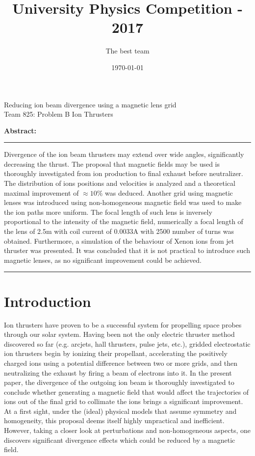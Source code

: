 \documentclass[twocolumn,12pt]{article}
\title{University Physics Competition - 2017}
\author{The best team}
\date{\today}
\numberwithin{equation}{section} %
\numberwithin{equation}{section}
\renewenvironment{abstract}{
\begin{center}
\begin{minipage}{0.85\textwidth}
\rule{\textwidth}{0pt}}
{\par\noindent\rule{\textwidth}{0pt}
\end{minipage} \end{center}}
\begin{document}
\begin{titlepage}
\begin{center}
\vspace{5mm}
\huge{Reducing ion beam divergence using a magnetic lens grid} \\
\vspace{5mm}
\Large{Team 825: Problem B Ion Thrusters} \\
\vspace{5mm}


\textbf{Abstract:}\\
\vspace{5mm}
\end{center}

\begin{abstract}
\justify
Divergence of the ion beam thrusters may extend over wide angles, significantly decreasing the thrust. The proposal that magnetic fields may be used is thoroughly investigated from ion production to final exhaust before neutralizer. The distribution of ions positions and velocities is analyzed and a theoretical maximal improvement of $\approx 10$\% was deduced. Another grid using magnetic lenses was introduced using non-homogeneous magnetic field was used to make the ion paths more uniform. The focal length of such lens is inversely proportional to the intensity of the magnetic field, numerically a focal length of the lens of 2.5m with coil current of 0.0033A with 2500 number of turns was obtained. Furthermore, a simulation of the behaviour of Xenon ions from jet thruster was presented. It was concluded that it is not practical to introduce such magnetic lenses, as no significant improvement could be achieved.

\end{abstract}
\end{titlepage}
\newpage



\tableofcontents

\justify

\section{Introduction}

Ion thrusters have proven to be a successful system for propelling space probes through our solar system. Having been not the only electric thruster method discovered so far (e.g. arcjets, hall thrusters, pulse jets, etc.), gridded electrostatic ion thrusters begin by ionizing their propellant, accelerating the positively charged ions using a potential difference between two or more grids, and then neutralizing the exhaust by firing a beam of electrons into it. In the present paper, the divergence of the outgoing ion beam is thoroughly investigated to conclude whether generating a magnetic field that would affect the trajectories of ions out of the final grid to collimate the ions brings a significant improvement. At a first sight, under the (ideal) physical models that assume symmetry and homogeneity, this proposal deems itself highly unpractical and inefficient. However, taking a closer look at perturbations and non-homogeneous aspects, one discovers significant divergence effects which could be reduced by a magnetic field. 
\end{document}
